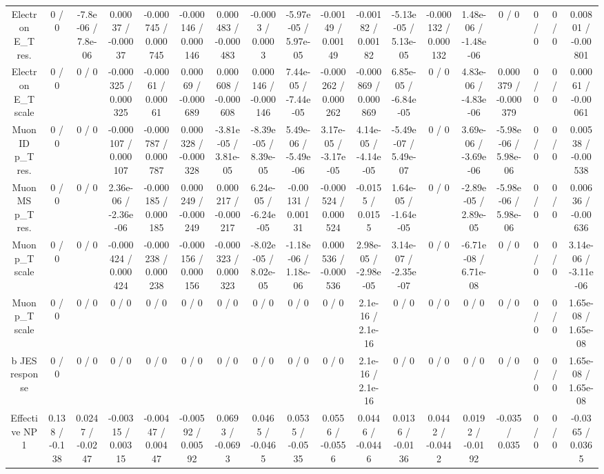 \documentclass[10pt]{article}
\begin{document}
\begin{table}[htbp]
\begin{center}
\begin{tabular}{|c|c|c|c|c|c|c|c|c|c|c|c|c|c|c|c|c|c|}
  Electron E_{T} res. & 0 / 0 & -7.8e-06 / 7.8e-06 & 0.00037 / -0.00037 & -0.000745 / 0.000745 & -0.000146 / 0.000146 & 0.000483 / -0.000483 & -0.0003 / 0.0003 & -5.97e-05 / 5.97e-05 & -0.00149 / 0.00149 & -0.00182 / 0.00182 & -5.13e-05 / 5.13e-05 & -0.000132 / 0.000132 & 1.48e-06 / -1.48e-06 & 0 / 0 & 0 / 0 & 0 / 0 & 0.00801 / -0.00801 \\ 
  Electron E_{T} scale & 0 / 0 & 0 / 0 & -0.000325 / 0.000325 & -0.00061 / 0.00061 & 0.00069 / -0.000689 & 0.000608 / -0.000608 & 0.000146 / -0.000146 & 7.44e-05 / -7.44e-05 & -0.000262 / 0.000262 & -0.000869 / 0.000869 & 6.85e-05 / -6.84e-05 & 0 / 0 & 4.83e-06 / -4.83e-06 & 0.000379 / -0.000379 & 0 / 0 & 0 / 0 & 0.00061 / -0.00061 \\ 
  Muon ID p_{T} res. & 0 / 0 & 0 / 0 & -0.000107 / 0.000107 & -0.000787 / 0.000787 & 0.000328 / -0.000328 & -3.81e-05 / 3.81e-05 & -8.39e-05 / 8.39e-05 & 5.49e-06 / -5.49e-06 & 3.17e-05 / -3.17e-05 & 4.14e-05 / -4.14e-05 & -5.49e-07 / 5.49e-07 & 0 / 0 & 3.69e-06 / -3.69e-06 & -5.98e-06 / 5.98e-06 & 0 / 0 & 0 / 0 & 0.00538 / -0.00538 \\ 
  Muon MS p_{T} res. & 0 / 0 & 0 / 0 & 2.36e-06 / -2.36e-06 & -0.000185 / 0.000185 & 0.000249 / -0.000249 & 0.000217 / -0.000217 & 6.24e-05 / -6.24e-05 & -0.00131 / 0.00131 & -0.000524 / 0.000524 & -0.0155 / 0.0155 & 1.64e-05 / -1.64e-05 & 0 / 0 & -2.89e-05 / 2.89e-05 & -5.98e-06 / 5.98e-06 & 0 / 0 & 0 / 0 & 0.00636 / -0.00636 \\ 
  Muon p_{T} scale & 0 / 0 & 0 / 0 & -0.000424 / 0.000424 & -0.000238 / 0.000238 & -0.000156 / 0.000156 & -0.000323 / 0.000323 & -8.02e-05 / 8.02e-05 & -1.18e-06 / 1.18e-06 & 0.000536 / -0.000536 & 2.98e-05 / -2.98e-05 & 3.14e-07 / -2.35e-07 & 0 / 0 & -6.71e-08 / 6.71e-08 & 0 / 0 & 0 / 0 & 0 / 0 & 3.14e-06 / -3.11e-06 \\ 
  Muon p_{T} scale & 0 / 0 & 0 / 0 & 0 / 0 & 0 / 0 & 0 / 0 & 0 / 0 & 0 / 0 & 0 / 0 & 0 / 0 & 2.1e-16 / 2.1e-16 & 0 / 0 & 0 / 0 & 0 / 0 & 0 / 0 & 0 / 0 & 0 / 0 & 1.65e-08 / 1.65e-08 \\ 
  b JES response & 0 / 0 & 0 / 0 & 0 / 0 & 0 / 0 & 0 / 0 & 0 / 0 & 0 / 0 & 0 / 0 & 0 / 0 & 2.1e-16 / 2.1e-16 & 0 / 0 & 0 / 0 & 0 / 0 & 0 / 0 & 0 / 0 & 0 / 0 & 1.65e-08 / 1.65e-08 \\ 
  Effective NP 1 & 0.138 / -0.138 & 0.0247 / -0.0247 & -0.00315 / 0.00315 & -0.00447 / 0.00447 & -0.00592 / 0.00592 & 0.0693 / -0.0693 & 0.0465 / -0.0465 & 0.0535 / -0.0535 & 0.0556 / -0.0556 & 0.0446 / -0.0446 & 0.0136 / -0.0136 & 0.0442 / -0.0442 & 0.0192 / -0.0192 & -0.035 / 0.035 & 0 / 0 & 0 / 0 & -0.0365 / 0.0365 \\ 

\end{tabular}
\end{center}
\end{table}
\end{document}
